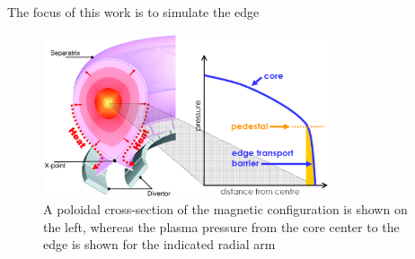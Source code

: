 \documentclass{beamer}
\begin{document}
\begin{frame}{The focus of this work is to simulate the edge}
\begin{figure}[h!]
  \centering
    \includegraphics[width=0.75\textwidth]{graphics/pedestal_and_poloidal_xsec}
  \caption{A poloidal cross-section of the magnetic configuration is shown on the left, whereas the plasma pressure from the core center to the edge is shown for the indicated radial arm}
\end{figure}
\end{frame}

\end{document}
